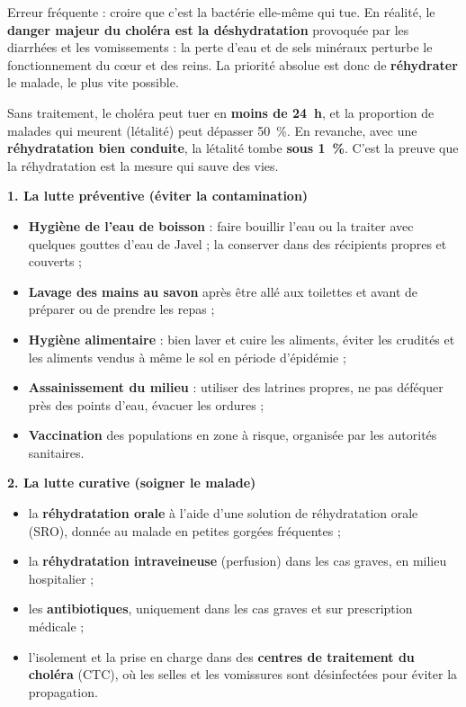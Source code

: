 \documentclass[11pt]{article}
\newcommand{\cle}[1]{{\popxbold\color{popdark}#1}}
\newcounter{popsec}
\newcounter{popsub}
\newcommand{\courssub}[1]{%
  \stepcounter{popsub}%
  \par\vspace{9pt}\noindent{\popxbold\fontsize{11.5}{13}\selectfont\color{popink}{\color{poporange}\thepopsec.\thepopsub}\hspace{6pt}#1}\par\nopagebreak\vspace{4pt}
}
\begin{document}
\begin{attention}
Erreur fréquente : croire que c'est la bactérie elle-même qui tue. En réalité, le \textbf{danger majeur du choléra est la déshydratation} provoquée par les diarrhées et les vomissements : la perte d'eau et de sels minéraux perturbe le fonctionnement du cœur et des reins. La priorité absolue est donc de \textbf{réhydrater} le malade, le plus vite possible.
\end{attention}

\begin{exemplebox}
Sans traitement, le choléra peut tuer en \textbf{moins de \SI{24}{h}}, et la proportion de malades qui meurent (létalité) peut dépasser \SI{50}{\%}. En revanche, avec une \textbf{réhydratation bien conduite}, la létalité tombe \textbf{sous \SI{1}{\%}}. C'est la preuve que la réhydratation est la mesure qui sauve des vies.
\end{exemplebox}

\courssub{Les moyens de lutte contre le choléra}

\textbf{1. La lutte préventive (éviter la contamination)}

\begin{itemize}
\item \textbf{Hygiène de l'eau de boisson} : faire bouillir l'eau ou la traiter avec quelques gouttes d'eau de Javel ; la conserver dans des récipients propres et couverts ;
\item \textbf{Lavage des mains au savon} après être allé aux toilettes et avant de préparer ou de prendre les repas ;
\item \textbf{Hygiène alimentaire} : bien laver et cuire les aliments, éviter les crudités et les aliments vendus à même le sol en période d'épidémie ;
\item \textbf{Assainissement du milieu} : utiliser des latrines propres, ne pas déféquer près des points d'eau, évacuer les ordures ;
\item \textbf{Vaccination} des populations en zone à risque, organisée par les autorités sanitaires.
\end{itemize}

\textbf{2. La lutte curative (soigner le malade)}

\begin{itemize}
\item la \textbf{réhydratation orale} à l'aide d'une \cle{solution de réhydratation orale} (SRO), donnée au malade en petites gorgées fréquentes ;
\item la \textbf{réhydratation intraveineuse} (perfusion) dans les cas graves, en milieu hospitalier ;
\item les \textbf{antibiotiques}, uniquement dans les cas graves et sur prescription médicale ;
\item l'isolement et la prise en charge dans des \textbf{centres de traitement du choléra} (CTC), où les selles et les vomissures sont désinfectées pour éviter la propagation.
\end{itemize}
\end{document}
